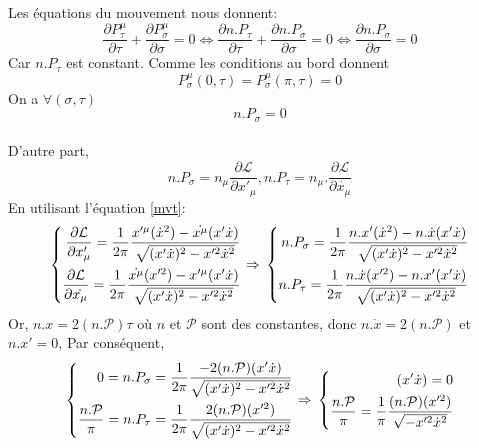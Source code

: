 \documentclass[a4paper,12pt]{article}
\def\xmu{x^\mu}
\def\CL{\mathcal{L}}
\begin{document}
Les équations du mouvement nous donnent:
$$\frac{\partial P^{\mu}_{\tau}}{\partial \tau}+\frac{\partial P^{\mu}_{\sigma}}{\partial \sigma}=0 \Leftrightarrow \frac{\partial n.P_{\tau}}{\partial \tau}+\frac{\partial n.P_{\sigma}}{\partial \sigma}=0 \Leftrightarrow \frac{\partial n.P_{\sigma}}{\partial \sigma}=0$$
Car $n.P_\tau$ est constant.
Comme les conditions au bord donnent
$$P_\sigma^\mu(0,\tau)=P_\sigma^\mu(\pi,\tau)=0$$
On a $\forall (\sigma,\tau)$ $$n.P_\sigma=0 $$\\
D'autre part, 
$$n.P_\sigma=n_\mu \frac{\partial \CL}{\partial x'_\mu }, n.P_\tau=n_\mu.\frac{\partial \CL}{\partial \dot{x_\mu}}$$
En utilisant l'équation \eqref{mvt}:
\begin{equation}
	\left\lbrace
	\begin{aligned}
	\frac{\partial \CL}{\partial x'_\mu }=\frac{1}{2\pi}\frac{x'^\mu (\dot{x}^2)-\dot{\xmu}(x'\dot{x})}{\sqrt{(x'\dot{x})^2-x'^2\dot{x}^2}}\\
	\frac{\partial \CL}{\partial \dot{x_\mu}}=\frac{1}{2\pi}\frac{\dot{\xmu} (x'^2)-x'^\mu(x'\dot{x})}{\sqrt{(x'\dot{x})^2-x'^2\dot{x}^2}}\\
	\end{aligned}
	\right.
	\Rightarrow\\
	\left\lbrace
	\begin{aligned}
	n.P_\sigma=\frac{1}{2\pi}\frac{n.x' (\dot{x}^2)-n.\dot{x}(x'\dot{x})}{\sqrt{(x'\dot{x})^2-x'^2\dot{x}^2}}\\
	n.P_\tau=\frac{1}{2\pi}\frac{n.\dot{x} (x'^2)-n.x'(x'\dot{x})}{\sqrt{(x'\dot{x})^2-x'^2\dot{x}^2}}
	\end{aligned}
	\right.
\end{equation}
Or, $n.x=2(n.\mathcal{P})\tau$ où $n$ et $\mathcal{P}$ sont des constantes,
donc $n.\dot{x}=2(n.\mathcal{P})$ et $n.x'=0$,
Par conséquent, 
\begin{equation}
	\left\lbrace
	\begin{aligned}
	0=n.P_\sigma=\frac{1}{2\pi}\frac{-2(n.\mathcal{P})(x'\dot{x})}{\sqrt{(x'\dot{x})^2-x'^2\dot{x}^2}}\\
	\frac{n.\mathcal{P}}{\pi}=n.P_\tau=\frac{1}{2\pi}\frac{2(n.\mathcal{P}) (x'^2)}{\sqrt{(x'\dot{x})^2-x'^2\dot{x}^2}}
	\end{aligned}
	\right.
	\Rightarrow\\
	\left\lbrace
	\begin{aligned}
	(x'\dot{x})=0\\
	\frac{n.\mathcal{P}}{\pi}=\frac{1}{\pi}\frac{(n.\mathcal{P}) (x'^2)}{\sqrt{-x'^2\dot{x}^2}}
	\end{aligned}
	\right.	
\end{equation}
\end{document}
